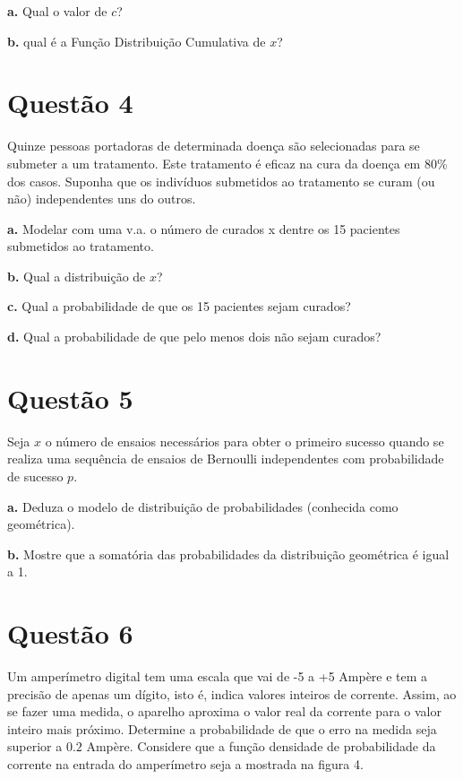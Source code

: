 \documentclass[a5paper]{report}
\begin{document}
\textbf{a.} Qual o valor de $c$?

\textbf{b.} qual é a Função Distribuição Cumulativa de $x$?


\section*{Questão 4}
Quinze pessoas portadoras de determinada doença são selecionadas para se submeter
a um tratamento. Este tratamento é eficaz na cura da doença em 80\% dos casos.
Suponha que os indivíduos submetidos ao tratamento se curam (ou não) independentes
uns do outros.

\textbf{a.} Modelar com uma v.a. o número de curados x dentre os 15 pacientes submetidos
ao tratamento.


\textbf{b.}
Qual a distribuição de $x$?


\textbf{c.}
Qual a probabilidade de que os 15 pacientes sejam curados?


\textbf{d.}
Qual a probabilidade de que pelo menos dois não sejam curados?


\section*{Questão 5}
Seja $x$ o número de ensaios necessários para obter o primeiro sucesso quando se realiza
uma sequência de ensaios de Bernoulli independentes com probabilidade de sucesso
$p$.

\textbf{a.} Deduza o modelo de distribuição de probabilidades (conhecida como geométrica).


\textbf{b.} Mostre que a somatória das probabilidades da distribuição geométrica é igual a 1.


\section*{Questão 6}
Um amperímetro digital tem uma escala que vai de -5 a +5 Ampère e tem a precisão de apenas um dígito, isto é, indica valores inteiros de corrente. Assim, ao se fazer uma medida, o aparelho aproxima o valor real da corrente para o valor inteiro mais próximo. Determine a probabilidade de que o erro na medida seja superior a $0.2$ Ampère. Considere que a função densidade de probabilidade da
corrente na entrada do amperímetro seja a mostrada na figura 4.
\end{document}

